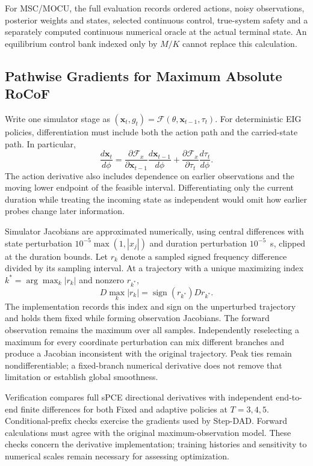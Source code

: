 \documentclass[journal]{IEEEtran}
\begin{document}
For MSC/MOCU, the full evaluation records ordered actions, noisy observations, posterior
weights and states, selected continuous control, true-system safety and a
separately computed continuous numerical oracle at the actual terminal state.
An equilibrium control bank indexed only by $M/K$ cannot replace this calculation.

\subsection{Pathwise Gradients for Maximum Absolute RoCoF}
Write one simulator stage as
$(\mathbf x_t,g_t)=\mathcal F(\theta,\mathbf x_{t-1},\tau_t)$.
For deterministic EIG policies, differentiation must include both the action
path and the carried-state path. In particular,
\begin{equation}
\frac{d\mathbf x_t}{d\phi}=
\frac{\partial\mathcal F_x}{\partial\mathbf x_{t-1}}
\frac{d\mathbf x_{t-1}}{d\phi}
+\frac{\partial\mathcal F_x}{\partial\tau_t}
\frac{d\tau_t}{d\phi}.
\label{eq:state-chain-gradient}
\end{equation}
The action derivative also includes dependence on earlier observations and
the moving lower endpoint of the feasible interval. Differentiating only the
current duration while treating the incoming state as independent would omit
how earlier probes change later information.

Simulator Jacobians are approximated numerically, using central differences
with state perturbation $10^{-5}\max(1,|x_j|)$ and duration perturbation
$10^{-5}$~s, clipped at the duration bounds. Let $r_k$ denote a sampled signed
frequency difference divided by its sampling interval. At a trajectory with a
unique maximizing index $k^*=\arg\max_k|r_k|$ and nonzero $r_{k^*}$,
\begin{equation}
D\max_k|r_k|=\operatorname{sign}(r_{k^*})D r_{k^*}.
\label{eq:active-rocof-gradient}
\end{equation}
The implementation records this index and sign on the unperturbed trajectory
and holds them fixed while forming observation Jacobians. The forward
observation remains the maximum over all samples. Independently reselecting
a maximum for every coordinate perturbation can mix different branches and
produce a Jacobian inconsistent with the original trajectory. Peak ties remain
nondifferentiable; a fixed-branch numerical derivative does not remove that
limitation or establish global smoothness.

Verification compares full sPCE directional derivatives with independent
end-to-end finite differences for both Fixed and adaptive policies at
$T=3,4,5$. Conditional-prefix checks exercise the gradients used by Step-DAD.
Forward calculations must agree with the original maximum-observation model.
These checks concern the derivative implementation; training histories and
sensitivity to numerical scales remain necessary for assessing optimization.
\end{document}
